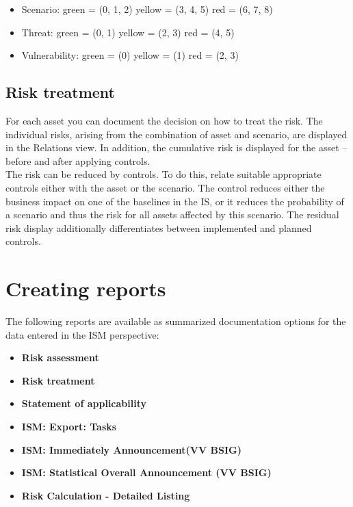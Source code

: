 \documentclass[a4paper,10pt]{book}
\begin{document}
\begin{itemize}
 \item Scenario:
 \subitem green = (0, 1, 2)
 \subitem yellow = (3, 4, 5)
 \subitem red = (6, 7, 8)
\end{itemize}

\begin{itemize}
 \item Threat:
 \subitem green = (0, 1)
 \subitem yellow = (2, 3)
 \subitem red = (4, 5)
\end{itemize}

\begin{itemize}
 \item Vulnerability:
 \subitem green = (0)
 \subitem yellow = (1)
 \subitem red = (2, 3)
\end{itemize}


\subsection{Risk treatment}
For each asset you can document the decision on how to treat the risk. The individual risks, arising from the combination
of asset and scenario, are displayed in the Relations view. In addition, the cumulative risk is displayed for the asset –
before and after applying controls.
\newline\\
The risk can be reduced by controls. To do this, relate suitable appropriate controls either with the asset or the scenario.
The control reduces either the business impact on one of the baselines in the IS, or it reduces the probability of a scenario
and thus the risk for all assets affected by this scenario. The residual risk display additionally differentiates between
implemented and planned controls.

\section{Creating reports}
\label{sec:ism-creating-reports}

The following reports are available as summarized documentation options for the
data entered in the ISM perspective:

\begin{itemize}
\item \textbf{Risk assessment}
\item \textbf{Risk treatment}
\item \textbf{Statement of applicability}
\item \textbf{ISM: Export: Tasks}
\item \textbf{ISM: Immediately Announcement(VV BSIG)}
\item \textbf{ISM: Statistical Overall Announcement (VV BSIG)}
\item \textbf{Risk Calculation - Detailed Listing}
\end{itemize}
\end{document}
